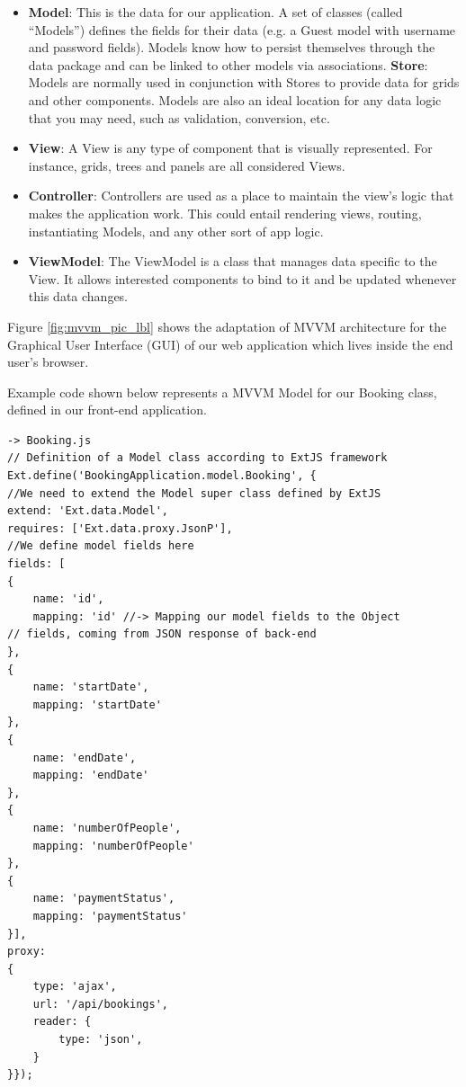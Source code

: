 \begin{itemize}
\item \textbf{Model}: This is the data for our application. A set of classes (called “Models”) defines the fields for their data (e.g. a Guest model with username and password fields). Models know how to persist themselves through the data package and can be linked to other models via associations.
\textbf{Store}: Models are normally used in conjunction with Stores to provide data for grids and other components. Models are also an ideal location for any data logic that you may need, such as validation, conversion, etc.
\item \textbf{View}: A View is any type of component that is visually represented. For instance, grids, trees and panels are all considered Views.
\item \textbf{Controller}: Controllers are used as a place to maintain the view's logic that makes the application work. This could entail rendering views, routing, instantiating Models, and any other sort of app logic.
\item \textbf{ViewModel}: The ViewModel is a class that manages data specific to the View. It allows interested components to bind to it and be updated whenever this data changes.
\end{itemize}

Figure \ref{fig:mvvm_pic_lbl} shows the adaptation of MVVM architecture for the Graphical User Interface (GUI) of our web application which lives inside the end user's browser.

Example code shown below represents a MVVM Model for our Booking class, defined in our front-end application.
\begin{verbatim}
-> Booking.js
// Definition of a Model class according to ExtJS framework
Ext.define('BookingApplication.model.Booking', {
//We need to extend the Model super class defined by ExtJS
extend: 'Ext.data.Model',
requires: ['Ext.data.proxy.JsonP'],
//We define model fields here
fields: [
{
    name: 'id',
    mapping: 'id' //-> Mapping our model fields to the Object 
// fields, coming from JSON response of back-end  
},
{
    name: 'startDate',
    mapping: 'startDate'
},
{
    name: 'endDate',
    mapping: 'endDate'
},
{
    name: 'numberOfPeople',
    mapping: 'numberOfPeople'
},
{
    name: 'paymentStatus',
    mapping: 'paymentStatus'
}],
proxy:
{
    type: 'ajax',
    url: '/api/bookings',
    reader: {
        type: 'json',
    }
}});
\end{verbatim}

